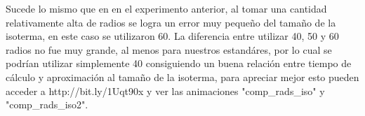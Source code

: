 Sucede lo mismo que en en el experimento anterior, al tomar una cantidad relativamente alta de radios se logra un error muy pequeño del tamaño de la isoterma, en este caso se utilizaron 60. La diferencia entre utilizar 40, 50 y 60 radios no fue muy grande, al menos para nuestros estandáres, por lo cual se podrían utilizar simplemente 40 consiguiendo un buena relación entre tiempo de cálculo y aproximación al tamaño de la isoterma, para apreciar mejor esto pueden acceder a http://bit.ly/1Uqt90x y ver las animaciones "comp\_rads\_iso" y "comp\_rads\_iso2".

